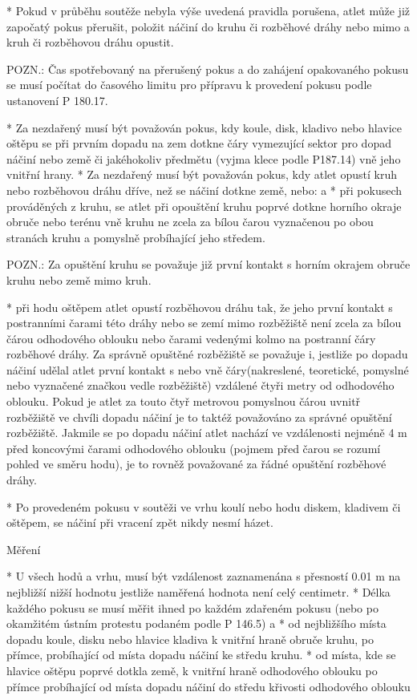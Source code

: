 * Pokud v průběhu soutěže nebyla výše uvedená pravidla porušena, atlet může již započatý pokus přerušit, položit náčiní do kruhu či rozběhové dráhy nebo mimo a kruh či rozběhovou dráhu opustit.

POZN.: Čas spotřebovaný na přerušený pokus a do zahájení opakovaného pokusu se musí počítat do časového limitu pro přípravu k provedení pokusu podle ustanovení P 180.17.

* Za nezdařený musí být považován pokus, kdy koule, disk, kladivo nebo hlavice oštěpu se při prvním dopadu na zem dotkne čáry vymezující sektor pro dopad náčiní nebo země či jakéhokoliv předmětu (vyjma klece podle P187.14) vně jeho vnitřní hrany.
* Za nezdařený musí být považován pokus, kdy atlet opustí kruh nebo rozběhovou dráhu dříve, než se náčiní dotkne země, nebo:
  \begitems \style a
  * při pokusech prováděných z kruhu, se atlet při opouštění kruhu poprvé dotkne horního okraje obruče nebo terénu vně kruhu  ne zcela za bílou čarou vyznačenou po obou stranách kruhu a pomyslně probíhající jeho středem.

  POZN.: Za opuštění kruhu se považuje již první kontakt s horním okrajem obruče kruhu nebo země mimo kruh.

  * při hodu oštěpem atlet opustí rozběhovou dráhu tak, že jeho první kontakt s postranními čarami této dráhy nebo se zemí mimo rozběžiště není zcela za bílou čárou odhodového oblouku nebo čarami vedenými kolmo na postranní čáry rozběhové dráhy. Za správně opuštěné rozběžiště se považuje i, jestliže po dopadu náčiní udělal atlet první kontakt s nebo vně čáry(nakreslené, teoretické, pomyslné nebo vyznačené značkou vedle rozběžiště) vzdálené čtyři metry od odhodového oblouku. Pokud je atlet za touto čtyř metrovou pomyslnou čárou uvnitř rozběžiště ve chvíli dopadu náčiní je to taktéž považováno za správné opuštění rozběžiště. Jakmile se po dopadu náčiní atlet nachází ve vzdálenosti nejméně 4 m před koncovými čarami odhodového oblouku (pojmem před čarou se rozumí pohled ve směru hodu), je to rovněž považované za řádné opuštění rozběhové dráhy.
  \enditems

* Po provedeném pokusu v soutěži ve vrhu koulí nebo hodu diskem, kladivem či oštěpem, se náčiní při vracení zpět nikdy  nesmí házet.

Měření

* U všech hodů a vrhu, musí být vzdálenost zaznamenána s přesností 0.01 m na nejbližší nižší hodnotu jestliže naměřená hodnota není celý centimetr.
* Délka každého pokusu se musí měřit ihned po každém zdařeném pokusu (nebo po okamžitém ústním protestu podaném podle P 146.5)
  \begitems \style a
  * od nejbližšího místa dopadu koule, disku nebo hlavice kladiva k vnitřní hraně obruče kruhu, po přímce, probíhající od místa dopadu náčiní ke středu kruhu.
  * od místa, kde se hlavice oštěpu poprvé dotkla země, k vnitřní hraně odhodového oblouku po přímce probíhající od místa dopadu náčiní do středu křivosti odhodového oblouku
  \enditems


